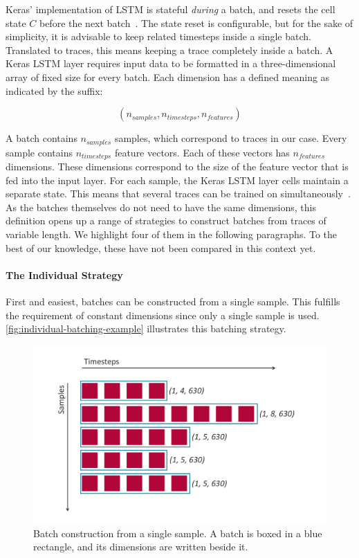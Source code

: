 Keras' implementation of LSTM is stateful \textit{during} a batch, and resets the cell state $C$ before the next batch~\cite{web:keras}.
The state reset is configurable, but for the sake of simplicity, it is advisable to keep related timesteps inside a single batch.
Translated to traces, this means keeping a trace completely inside a batch.
A Keras LSTM layer requires input data to be formatted in a three-dimensional array of fixed size for every batch.
Each dimension has a defined meaning as indicated by the suffix:

$$(n_{samples}, n_{timesteps}, n_{features})$$

A batch contains $n_{samples}$ samples, which correspond to traces in our case.
Every sample contains $n_{timesteps}$ feature vectors.
Each of these vectors has $n_{features}$ dimensions.
These dimensions correspond to the size of the feature vector that is fed into the input layer.
For each sample, the Keras LSTM layer cells maintain a separate state.
This means that several traces can be trained on simultaneously~\cite{web:keras-lstm-state}.
As the batches themselves do not need to have the same dimensions, this definition opens up a range of strategies to construct batches from traces of variable length.
We highlight four of them in the following paragraphs.
To the best of our knowledge, these have not been compared in this context yet.\\

\paragraph{The Individual Strategy}
First and easiest, batches can be constructed from a single sample.
This fulfills the requirement of constant dimensions since only a single sample is used.
\autoref{fig:individual-batching-example} illustrates this batching strategy.

\begin{figure}[!htb]
    \centering
    \includegraphics[width=\textwidth]{gfx/individual-batching.pdf}
    \caption[Individual strategy for batches]{Batch construction from a single sample. A batch is boxed in a blue rectangle, and its dimensions are written beside it.}
    \label{fig:individual-batching-example}
\end{figure}

